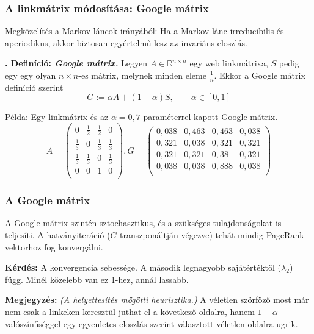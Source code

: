 \documentclass[]{beamer}
\newcounter{definicioszam}
\newenvironment{definicio}[1]
{{\medskip}\noindent \stepcounter{definicioszam}
{\bfseries{\thedefinicioszam. Definíció: \textit{#1.}}}}{\bigskip }
\begin{document}
\begin{frame}
	\frametitle{A linkmátrix módosítása: Google mátrix}
	
	Megközelítés a Markov-láncok irányából: Ha a Markov-lánc irreducibilis és aperiodikus, akkor biztosan egyértelmű lesz az invariáns eloszlás.
	
	\begin{definicio}{Google mátrix}
		Legyen $A \in \mathbb{R}^{n \times n}$ egy web linkmátrixa, $S$ pedig egy egy olyan $n \times n$-es mátrix, melynek minden eleme $\frac{1}{n}$. Ekkor a Google mátrix definíció szerint
		\[ G := \alpha A + (1-\alpha) S, \qquad \alpha \in [0,1] \]
	\end{definicio}

\vspace{-0.8cm}
Példa: Egy linkmátrix és az $\alpha = 0,7$ paraméterrel kapott Google mátrix.
\[A =
\begin{pmatrix}
0 & \frac{1}{2} & \frac{1}{2} & 0 \\
\frac{1}{3} & 0 & \frac{1}{3} & \frac{1}{3} \\
\frac{1}{3} & \frac{1}{3} & 0 & \frac{1}{3} \\
0 & 0 & 1 & 0 \\
\end{pmatrix},
G = 
\begin{pmatrix}
0,\!038 & 0,\!463 & 0,\!463 & 0,\!038 \\
0,\!321 & 0,\!038 & 0,\!321 & 0,\!321 \\
0,\!321 & 0,\!321 & 0,\!38 & 0,\!321 \\
0,\!038 & 0,\!038 & 0,\!888 & 0,\!038 \\
\end{pmatrix}
\]
\end{frame}

\begin{frame}
	\frametitle{A Google mátrix}
	
	A Google mátrix szintén sztochasztikus, és a szükséges tulajdonságokat is teljesíti. A hatványiteráció ($G$ transzponáltján végezve) tehát mindig PageRank vektorhoz fog konvergálni.
	
	\bigskip
	
	\textbf{Kérdés:} A konvergencia sebessége. A második legnagyobb sajátértéktől ($\lambda_2$) függ. Minél közelebb van ez 1-hez, annál lassabb.
	
	\bigskip
	
	\textbf{Megjegyzés:} \textit{(A helyettesítés mögötti heurisztika.)} \newline
	A véletlen szörföző most már nem csak a linkeken keresztül juthat el a következő oldalra, hanem $1-\alpha$ valószínűséggel egy egyenletes eloszlás szerint választott véletlen oldalra ugrik.
\end{frame}
\end{document}
